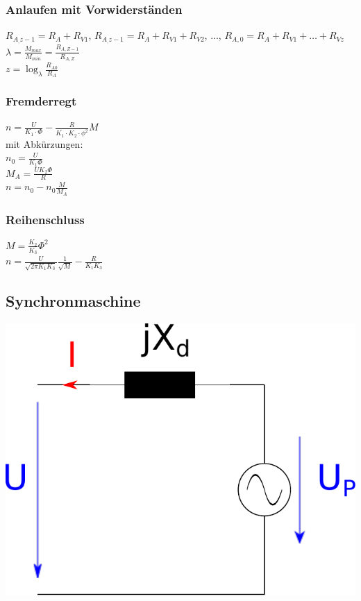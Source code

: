 \documentclass[fs, footer]{latex4ei}
\begin{document}
\begin{multicols}{4}
		\subsubsection{Anlaufen mit Vorwiderständen}
		$R_{A_,z-1} = R_A + R_{V1}$, $R_{A_,z-1} = R_A + R_{V1} + R_{V2}$, ..., $R_{A,0} = R_A + R_{V1} + \hdots + R_{Vz}$ \\
		$\lambda = \frac{M_{max}}{M_{min}} = \frac{R_{A,Z-1}}{R_{A,Z}}$ \\
		$ z = \log_\lambda \frac{R_{A0}}{R_A}$
		
		
		\subsubsection{Fremderregt}
		$n = \frac{U}{ K_1 \cdot \Phi} - \frac{R}{K_1 \cdot K_2 \cdot \phi^2}M$\\

		mit Abkürzungen: \\
		$n_0 = \frac{U}{K_1 \Phi}$ \\
		$M_A = \frac{U K_2 \Phi}{R}$ \\
		$n = n_0 - n_0 \frac{M}{M_A}$
		
		
		\subsubsection{Reihenschluss}
		$M = \frac{K_2}{K_3} \Phi^2$ \\
		$n = \frac{U}{\sqrt{2 \pi K_1 K_3}} \frac{1}{\sqrt{M}} - \frac{R}{K_1 K_3}$
		
		
		\subsection{Synchronmaschine}
		
		\begin{center}
		\includegraphics[scale=.2]{./img/ersatzschaltbild_synchronmaschine.pdf}
		\end{center}
		

\end{multicols}
\end{document}
